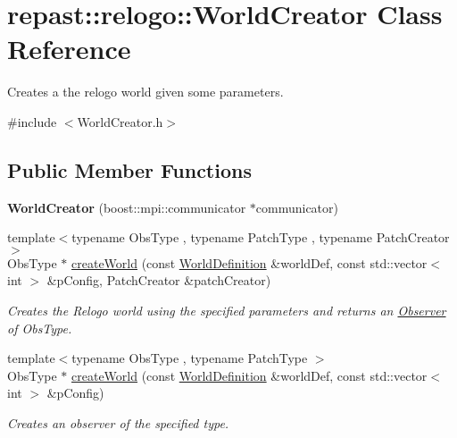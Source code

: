 \hypertarget{classrepast_1_1relogo_1_1_world_creator}{\section{repast\-:\-:relogo\-:\-:World\-Creator Class Reference}
\label{classrepast_1_1relogo_1_1_world_creator}
}


Creates a the relogo world given some parameters.  




{\ttfamily \#include $<$World\-Creator.\-h$>$}

\subsection*{Public Member Functions}
\begin{DoxyCompactItemize}
\item 
\hypertarget{classrepast_1_1relogo_1_1_world_creator_af646a6d5a01d95f736f417e0b1347d92}{{\bfseries World\-Creator} (boost\-::mpi\-::communicator $\ast$communicator)}\label{classrepast_1_1relogo_1_1_world_creator_af646a6d5a01d95f736f417e0b1347d92}

\item 
{\footnotesize template$<$typename Obs\-Type , typename Patch\-Type , typename Patch\-Creator $>$ }\\Obs\-Type $\ast$ \hyperlink{classrepast_1_1relogo_1_1_world_creator_a61ef4601065168dfc0fc7fbf4d47e181}{create\-World} (const \hyperlink{classrepast_1_1relogo_1_1_world_definition}{World\-Definition} \&world\-Def, const std\-::vector$<$ int $>$ \&p\-Config, Patch\-Creator \&patch\-Creator)
\begin{DoxyCompactList}\small\item\em Creates the Relogo world using the specified parameters and returns an \hyperlink{classrepast_1_1relogo_1_1_observer}{Observer} of Obs\-Type. \end{DoxyCompactList}\item 
{\footnotesize template$<$typename Obs\-Type , typename Patch\-Type $>$ }\\Obs\-Type $\ast$ \hyperlink{classrepast_1_1relogo_1_1_world_creator_aaceddc663139a0fda80b3022e0cd0d08}{create\-World} (const \hyperlink{classrepast_1_1relogo_1_1_world_definition}{World\-Definition} \&world\-Def, const std\-::vector$<$ int $>$ \&p\-Config)
\begin{DoxyCompactList}\small\item\em Creates an observer of the specified type. \end{DoxyCompactList}\end{DoxyCompactItemize}


